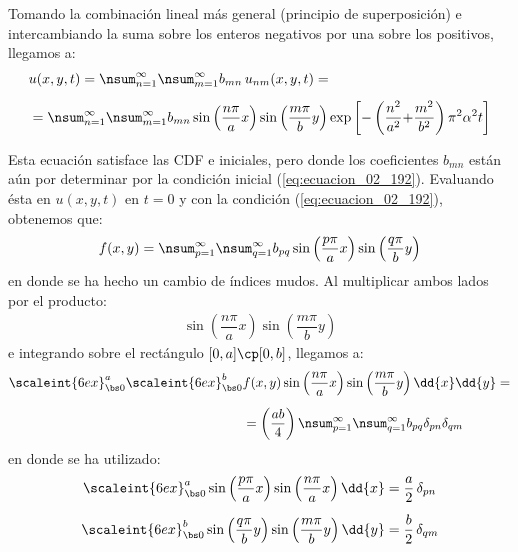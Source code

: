 Tomando la combinación lineal más general (principio de superposición) e intercambiando la suma sobre los enteros negativos por una sobre los positivos, llegamos a:
\begin{align}
&u (x, y, t) = \nsum_{n=1}^{\infty} \nsum_{m=1}^{\infty} b_{mn} \, u_{nm} (x, y, t) = \label{eq:ecuacion_02_207} \\[0.5em]
&= \nsum_{n=1}^{\infty} \nsum_{m=1}^{\infty} b_{mn} \sin \left( \dfrac{n \pi}{a} x \right) \sin \left( \dfrac{m \pi}{b} y \right) \exp\left[ - \left( \dfrac{n^{2}}{a^{2}} {+} \dfrac{m^{2}}{b^{2}} \right) \pi^{2} \alpha^{2} t \right] \label{eq:ecuacion_02_208}
\end{align}

Esta ecuación satisface las CDF e iniciales, pero donde los coeficientes $b_{mn}$ están aún por determinar por la condición inicial (\ref{eq:ecuacion_02_192}). Evaluando ésta en $u (x, y, t)$ en $t = 0$ y con la condición (\ref{eq:ecuacion_02_192}), obtenemos que:
\begin{align}
f (x,y) = \nsum_{p=1}^{\infty} \nsum_{q=1}^{\infty} b_{pq} \sin \left( \dfrac{p \pi}{a} x \right) \sin \left( \dfrac{q \pi}{b} y \right) 
\end{align}
en donde se ha hecho un cambio de índices mudos. Al multiplicar ambos lados por el producto:
\begin{align*}
\sin \left( \dfrac{n \pi}{a} x \right) \sin \left( \dfrac{m \pi}{b} y \right) 
\end{align*}
e integrando sobre el rectángulo $[0, a] \cp [0, b]$, llegamos a:
\begin{align}
\begin{aligned}[b]
\scaleint{6ex}_{\bs 0}^{a} \scaleint{6ex}_{\bs 0}^{b} & f (x, y) \sin \left( \dfrac{n \pi}{a} x \right) \sin \left( \dfrac{m \pi}{b} y \right) \dd{x} \dd{y} = \\[0.5em]
&=\left( \dfrac{a b}{4} \right) \nsum_{p=1}^{\infty} \nsum_{q=1}^{\infty} b_{pq} \delta_{pn} \delta_{qm}
\end{aligned}
\label{eq:ecuacion_02_210}
\end{align}
en donde se ha utilizado:
\begin{align}
\scaleint{6ex}_{\bs 0}^{a} \sin \left( \dfrac{p \pi}{a} x \right) \sin \left( \dfrac{n \pi}{a} x \right) \dd{x} &= \dfrac{a}{2} \, \delta_{pn} \label{eq:ecuacion_02_211} \\[0.5em]
\scaleint{6ex}_{\bs 0}^{b} \sin \left( \dfrac{q \pi}{b} y \right) \sin \left( \dfrac{m \pi}{b} y \right) \dd{y} &= \dfrac{b}{2} \, \delta_{qm} \label{eq:ecuacion_02_212}
\end{align}
